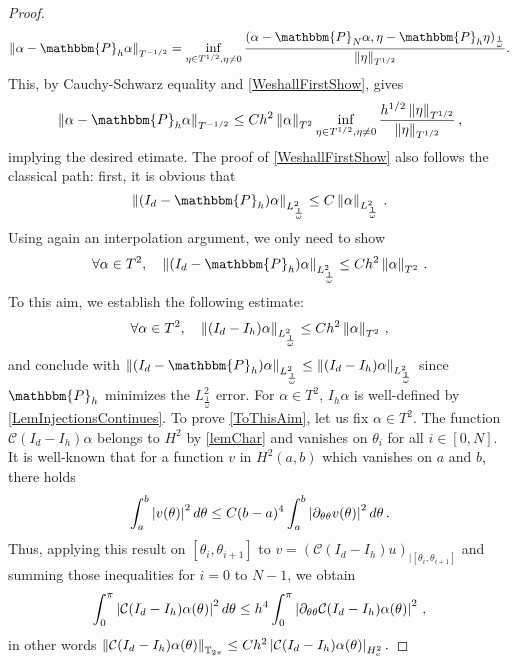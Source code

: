 \documentclass[a4paper]{article}
\begin{document}
\begin{proof}
\[\norm{\alpha - \mathbbm{P}_h \alpha}_{T^{-1/2}} = \inf_{\eta \in T^{1/2}, \eta \neq 0} \dfrac{(\alpha - \mathbbm{P}_N \alpha,\eta -\mathbbm{P}_h \eta )_{\frac{1}{\omega}}}{\norm{\eta}_{T^{1/2}}}.\]
This, by Cauchy-Schwarz equality and \eqref{WeshallFirstShow}, gives 
\[\norm{\alpha- \mathbbm{P}_h\alpha}_{T^{-1/2}} \leq Ch^2 \norm{\alpha}_{T^2}\inf_{\eta \in T^{1/2}, \eta \neq 0}  \frac{h^{1/2} \norm{\eta}_{T^{1/2}}}{\norm{\eta}_{T^{1/2}}}\,,\] 
implying the desired etimate. The proof of \eqref{WeshallFirstShow} also follows the classical path: first, it is obvious that 
\[\norm{(I_d - \mathbbm{P}_h)\alpha}_{L^2_\frac{1}{\omega}} \leq C \norm{\alpha}_{L^2_\frac{1}{\omega}}\,.\]
Using again an interpolation argument, we only need to show 
\begin{equation}
	\forall \alpha \in T^2, \quad \norm{(I_d - \mathbbm{P}_h)\alpha}_{L^2_\frac{1}{\omega}} \leq C h^2 \norm{\alpha}_{T^2}\,.
	\label{WeOnlyNeedToShow}
\end{equation}
To this aim, we establish the following estimate:
\begin{equation}
	\forall \alpha \in T^2, \quad \left\|(I_d - I_h)\alpha\right\|_{L^2_\frac{1}{\omega}} \leq C h^2 \left\|\alpha\right\|_{T^2}\,,
	\label{ToThisAim}
\end{equation}
and conclude with $\norm{(I_d - \mathbbm{P}_h)\alpha}_{L^2_\frac{1}{\omega}} \leq \norm{(I_d - I_h)\alpha}_{L^2_\frac{1}{\omega}}$ since $\mathbbm{P}_h$ minimizes the $L^2_\frac{1}{\omega}$ error. For $\alpha \in T^2$, $I_h \alpha$ is well-defined by \autoref{LemInjectionsContinues}. To prove \eqref{ToThisAim}, let us fix $\alpha \in T^2$. 
The function $\mathcal{C}(I_d - I_h)\alpha$ belongs to $H^2$ by \autoref{lemChar} and vanishes on $\theta_i$ for all $i \in [0,N]$. It is well-known that for a function $v$ in $H^2(a,b)$ which vanishes on $a$ and $b$, there holds 
\begin{equation}
	\int_{a}^b \left\lvert v(\theta) \right\rvert^2d\theta \leq C (b-a)^4\int_{a}^b \left\lvert \partial_{\theta \theta} v(\theta) \right\rvert^2 d\theta\,.
	\label{H2nulleaubord}
\end{equation}
	Thus, applying this result on $[\theta_i,\theta_{i+1}]$ to $v = (\mathcal{C}(I_d - I_h)u)_{|[\theta_i,\theta_{i+1}]}$ and summing those inequalities for $i = 0$ to $N-1$, we obtain
	\[\int_{0}^{\pi} \left\lvert \mathcal{C}(I_d - I_h)\alpha(\theta) \right\rvert^2 d\theta \leq h^4\int_{0}^{\pi} \left\lvert \partial_{\theta\theta}\mathcal{C}(I_d - I_h)\alpha(\theta)  \right\rvert^2\,,\]
	in other words $\left\|\mathcal{C}(I_d - I_h)\alpha(\theta)\right\|_{\mathbb{T}_{2\pi}} \leq Ch^2 \left\lvert \mathcal{C}(I_d - I_h)\alpha(\theta) \right\rvert_{H^2_e}.$

\end{proof}
\end{document}
